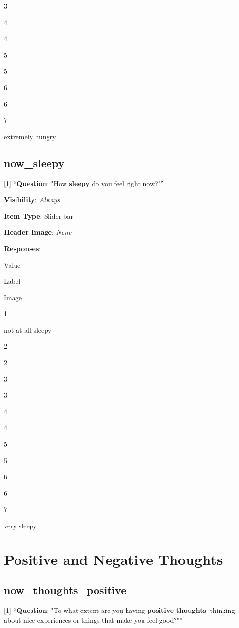\documentclass[]{book}
\begin{document}
3

4

4

5

5

6

6

7

extremely hungry

\hypertarget{now_sleepy}{%
\section{now\_sleepy}\label{now_sleepy}}

{[}1{]} ``\textbf{Question}: "How \textbf{sleepy} do you feel right now?"''

\textbf{Visibility}: \emph{Always}

\textbf{Item Type}: Slider bar

\textbf{Header Image}: \emph{None}

\textbf{Responses}:

Value

Label

Image

1

not at all sleepy

2

2

3

3

4

4

5

5

6

6

7

very sleepy

\hypertarget{thoughts_section}{%
\chapter{Positive and Negative Thoughts}\label{thoughts_section}}

\hypertarget{now_thoughts_positive}{%
\section{now\_thoughts\_positive}\label{now_thoughts_positive}}

{[}1{]} ``\textbf{Question}: "To what extent are you having \textbf{positive thoughts}, thinking about nice experiences or things that make you feel good?"''
\end{document}
